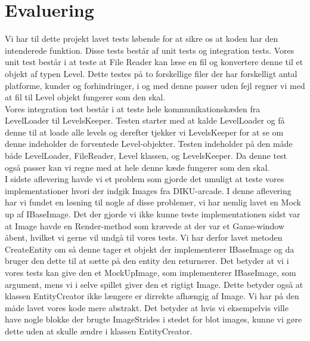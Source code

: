 \section{Evaluering}
Vi har til dette projekt lavet tests løbende for at sikre os at koden har den intenderede funktion. Disse tests består af unit tests og integration tests. Vores unit test består i at teste at File Reader kan læse en fil og konvertere denne til et objekt af typen Level. Dette testes på to forskellige filer der har forskelligt antal platforme, kunder og forhindringer, i og med denne passer uden fejl regner vi med at fil til Level objekt fungerer som den skal.\\
Vores integration test består i at teste hele kommunikationskæden fra LevelLoader til LevelsKeeper. Testen starter med at kalde LevelLoader og få denne til at loade alle levels og derefter tjekker vi LevelsKeeper for at se om denne indeholder de forventede Level-objekter. Testen indeholder på den måde både LevelLoader, FileReader, Level klassen, og LevelsKeeper. Da denne test også passer kan vi regne med at hele denne kæde fungerer som den skal.\\
I sidste aflevering havde vi et problem som gjorde det umuligt at teste vores implementationer hvori der indgik Images fra DIKU-arcade. I denne aflevering har vi fundet en løsning til nogle af disse problemer, vi har nemlig lavet en Mock up af IBaseImage. Det der gjorde vi ikke kunne teste implementationen sidst var at Image havde en Render-method som krævede at der var et Game-window åbent, hvilket vi gerne vil undgå til vores tests. Vi har derfor lavet metoden CreateEntity om så denne tager et objekt der implementerer IBaseImage og da bruger den dette til at sætte på den entity den returnerer. Det betyder at vi i vores tests kan give den et MockUpImage, som implementerer IBaseImage, som argument, mens vi i selve spillet giver den et rigtigt Image. Dette betyder også at klassen EntityCreator ikke længere er dirrekte afhængig af Image. Vi har på den måde lavet vores kode mere abstrakt. Det betyder at hvis vi eksempelvis ville have nogle blokke der brugte ImageStrides i stedet for blot images, kunne vi gøre dette uden at skulle ændre i klassen EntityCreator.
